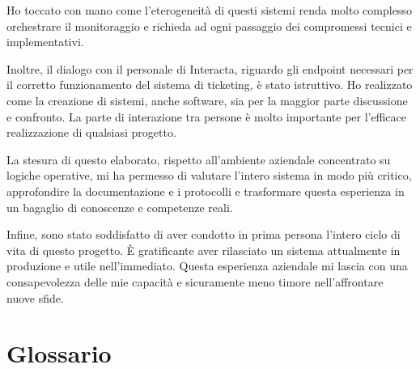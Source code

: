\documentclass[12pt, a4paper, oneside]{report}
\begin{document}
Ho toccato con mano come l'eterogeneità di questi sistemi renda molto complesso orchestrare il monitoraggio e richieda ad ogni passaggio dei compromessi tecnici e implementativi.

Inoltre, il dialogo con il personale di Interacta, riguardo gli endpoint necessari per il corretto funzionamento del sistema di ticketing, è stato istruttivo. Ho realizzato come la creazione di sistemi, anche software, sia per la maggior parte discussione e confronto. La parte di interazione tra persone è molto importante per l'efficace realizzazione di qualsiasi progetto.

La stesura di questo elaborato, rispetto all'ambiente aziendale concentrato su logiche operative, mi ha permesso di valutare l'intero sistema in modo più critico, approfondire la documentazione e i protocolli e trasformare questa esperienza in un bagaglio di conoscenze e competenze reali.

Infine, sono stato soddisfatto di aver condotto in prima persona l'intero ciclo di vita di questo progetto. È gratificante aver rilasciato un sistema attualmente in produzione e utile nell'immediato. Questa esperienza aziendale mi lascia con una consapevolezza delle mie capacità e sicuramente meno timore nell'affrontare nuove sfide.

\clearpage
{} %



\chapter*{Glossario}
\end{document}
